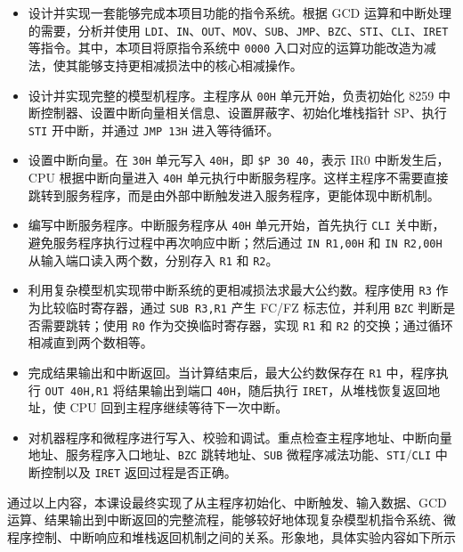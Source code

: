 \documentclass[UTF8,12pt,a4paper]{ctexart}
\newcommand{\hex}[1]{\texttt{#1H}}
\newcommand{\reg}[1]{\texttt{#1}}
\newcommand{\inst}[1]{\texttt{#1}}
\newcommand{\prog}[1]{\texttt{\$P #1}}
\begin{document}
\begin{itemize}
  \item 设计并实现一套能够完成本项目功能的指令系统。根据 GCD 运算和中断处理的需要，分析并使用 \inst{LDI}、\inst{IN}、\inst{OUT}、\inst{MOV}、\inst{SUB}、\inst{JMP}、\inst{BZC}、\inst{STI}、\inst{CLI}、\inst{IRET} 等指令。其中，本项目将原指令系统中 \texttt{0000} 入口对应的运算功能改造为减法，使其能够支持更相减损法中的核心相减操作。

  \item 设计并实现完整的模型机程序。主程序从 \hex{00} 单元开始，负责初始化 8259 中断控制器、设置中断向量相关信息、设置屏蔽字、初始化堆栈指针 SP、执行 \inst{STI} 开中断，并通过 \inst{JMP 13H} 进入等待循环。

  \item 设置中断向量。在 \hex{30} 单元写入 \hex{40}，即 \prog{30 40}，表示 IR0 中断发生后，CPU 根据中断向量进入 \hex{40} 单元执行中断服务程序。这样主程序不需要直接跳转到服务程序，而是由外部中断触发进入服务程序，更能体现中断机制。

  \item 编写中断服务程序。中断服务程序从 \hex{40} 单元开始，首先执行 \inst{CLI} 关中断，避免服务程序执行过程中再次响应中断；然后通过 \inst{IN R1,00H} 和 \inst{IN R2,00H} 从输入端口读入两个数，分别存入 \reg{R1} 和 \reg{R2}。

  \item 利用复杂模型机实现带中断系统的更相减损法求最大公约数。程序使用 \reg{R3} 作为比较临时寄存器，通过 \inst{SUB R3,R1} 产生 FC/FZ 标志位，并利用 \inst{BZC} 判断是否需要跳转；使用 \reg{R0} 作为交换临时寄存器，实现 \reg{R1} 和 \reg{R2} 的交换；通过循环相减直到两个数相等。

  \item 完成结果输出和中断返回。当计算结束后，最大公约数保存在 \reg{R1} 中，程序执行 \inst{OUT 40H,R1} 将结果输出到端口 \hex{40}，随后执行 \inst{IRET}，从堆栈恢复返回地址，使 CPU 回到主程序继续等待下一次中断。

  \item 对机器程序和微程序进行写入、校验和调试。重点检查主程序地址、中断向量地址、服务程序入口地址、\inst{BZC} 跳转地址、\inst{SUB} 微程序减法功能、\inst{STI}/\inst{CLI} 中断控制以及 \inst{IRET} 返回过程是否正确。
\end{itemize}

通过以上内容，本课设最终实现了从主程序初始化、中断触发、输入数据、GCD 运算、结果输出到中断返回的完整流程，能够较好地体现复杂模型机指令系统、微程序控制、中断响应和堆栈返回机制之间的关系。形象地，具体实验内容如下所示
\end{document}
